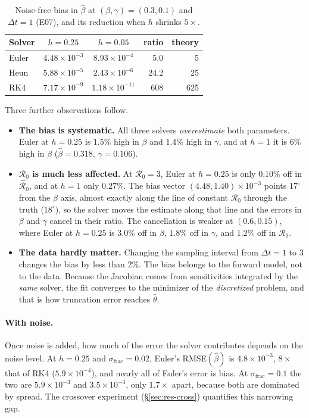 \documentclass[sigconf]{acmart}
\begin{document}
\begin{table}[t]
  \centering
  \footnotesize
  \caption{Noise-free bias in $\hat\beta$ at $(\beta,\gamma)=(0.3,0.1)$
    and $\Delta t=1$ (E07), and its reduction when $h$ shrinks
    $5\times$.}
  \label{tab:bias}
  \begin{tabular}{@{}lccrr@{}}
    \toprule
    Solver & $h=0.25$ & $h=0.05$ & ratio & theory\\
    \midrule
    Euler & $4.48\times10^{-3}$ & $8.93\times10^{-4}$ & 5.0 & 5\\
    Heun  & $5.88\times10^{-5}$ & $2.43\times10^{-6}$ & 24.2 & 25\\
    RK4   & $7.17\times10^{-9}$ & $1.18\times10^{-11}$ & 608 & 625\\
    \bottomrule
  \end{tabular}
\end{table}

Three further observations follow.
\begin{itemize}
  \item \textbf{The bias is systematic.} All three solvers
    \emph{overestimate} both parameters. Euler at $h=0.25$ is $1.5\%$
    high in $\beta$ and $1.4\%$ high in $\gamma$, and at $h=1$ it is
    $6\%$ high in $\beta$ ($\hat\beta=0.318$, $\hat\gamma=0.106$).
  \item \textbf{$\mathcal R_0$ is much less affected.} At
    $\mathcal R_0=3$, Euler at $h=0.25$ is only $0.10\%$ off in
    $\hat{\mathcal R}_0$, and at $h=1$ only $0.27\%$. The bias vector
    $(4.48,1.40)\times10^{-3}$ points $17^\circ$ from the $\beta$ axis,
    almost exactly along the line of constant $\mathcal R_0$ through the
    truth ($18^\circ$), so the solver moves the estimate along that line
    and the errors in $\beta$ and $\gamma$ cancel in their ratio. The
    cancellation is weaker at $(0.6,0.15)$, where Euler at $h=0.25$ is
    $3.0\%$ off in $\beta$, $1.8\%$ off in $\gamma$, and $1.2\%$ off in
    $\mathcal R_0$.
  \item \textbf{The data hardly matter.} Changing the sampling interval
    from $\Delta t=1$ to $3$ changes the bias by less than 2\%. The bias
    belongs to the forward model, not to the data. Because the Jacobian
    comes from sensitivities integrated by the \emph{same} solver, the
    fit converges to the minimizer of the \emph{discretized} problem,
    and that is how truncation error reaches $\hat\theta$.
\end{itemize}

\paragraph{With noise.} Once noise is added, how much of the error the
solver contributes depends on the noise level. At $h=0.25$ and
$\sigma_{\mathrm{frac}}=0.02$, Euler's RMSE$(\hat\beta)$ is
$4.8\times10^{-3}$, $8\times$ that of RK4 ($5.9\times10^{-4}$), and
nearly all of Euler's error is bias. At $\sigma_{\mathrm{frac}}=0.1$ the
two are $5.9\times10^{-3}$ and $3.5\times10^{-3}$, only $1.7\times$
apart, because both are dominated by spread. The crossover experiment
(\S\ref{sec:res-cross}) quantifies this narrowing gap.
\end{document}
